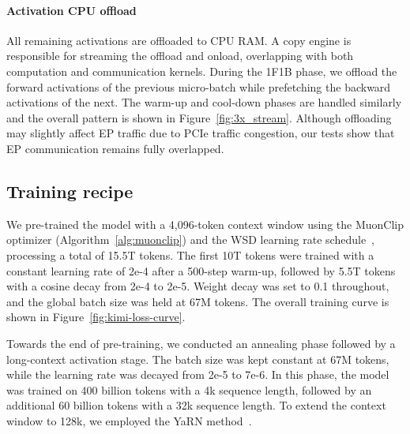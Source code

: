 \paragraph{Activation CPU offload}

All remaining activations are offloaded to CPU RAM. A copy engine is responsible for streaming the offload and onload, overlapping with both computation and communication kernels. During the 1F1B phase, we offload the forward activations of the previous micro-batch while prefetching the backward activations of the next. The warm-up and cool-down phases are handled similarly and the overall pattern is shown in Figure~\ref{fig:3x_stream}. Although offloading may slightly affect EP traffic due to PCIe traffic congestion, our tests show that EP communication remains fully overlapped.



\subsection{Training recipe}

We pre-trained the model with a 4,096-token context window using the MuonClip optimizer (Algorithm~\ref{alg:muonclip}) and the WSD learning rate schedule~\citep{hu2024minicpm}, processing a total of 15.5T tokens. 
The first 10T tokens were trained with a constant learning rate of 2e-4 after a 500-step warm-up,
followed by 5.5T tokens with a cosine decay from 2e-4 to 2e-5. 
Weight decay was set to 0.1 throughout, and the global batch size was held at 67M tokens. The overall training curve is shown in Figure~\ref{fig:kimi-loss-curve}.

Towards the end of pre-training, we conducted an annealing phase followed by a long-context activation stage. The batch size was kept constant at 67M tokens, while the learning rate was decayed from 2e-5 to 7e-6. In this phase, the model was trained on 400 billion tokens with a 4k sequence length, followed by an additional 60 billion tokens with a 32k sequence length. To extend the context window to 128k, we employed the YaRN method~\citep{peng2023yarn}.








    





